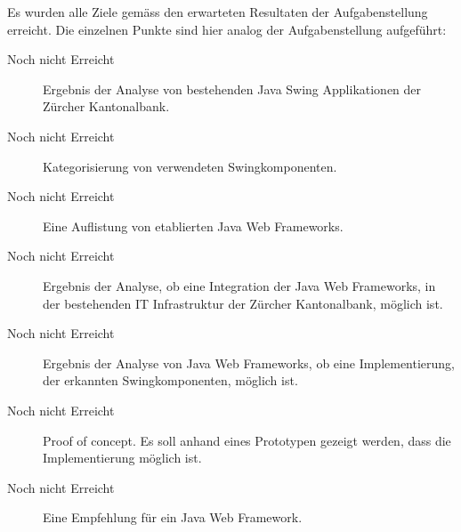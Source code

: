   Es wurden alle Ziele gemäss den erwarteten Resultaten der Aufgabenstellung
  erreicht. Die einzelnen Punkte sind hier analog der Aufgabenstellung
  aufgeführt:
  
  \begin{description}
    \item [Noch nicht Erreicht] Ergebnis der Analyse von bestehenden Java Swing
    Applikationen der Zürcher Kantonalbank.
    \item [Noch nicht Erreicht] Kategorisierung von verwendeten
    Swingkomponenten.
    \item [Noch nicht Erreicht] Eine Auflistung von etablierten Java Web
    Frameworks.
    \item [Noch nicht Erreicht] Ergebnis der Analyse, ob eine Integration der
    Java Web Frameworks, in der bestehenden IT Infrastruktur der Zürcher
    Kantonalbank, möglich ist.
    \item [Noch nicht Erreicht] Ergebnis der Analyse von Java Web Frameworks, ob
    eine Implementierung, der erkannten Swingkomponenten, möglich ist.
    \item [Noch nicht Erreicht] Proof of concept. Es soll anhand eines
    Prototypen gezeigt werden, dass die Implementierung möglich ist.
    \item [Noch nicht Erreicht] Eine Empfehlung für ein Java Web Framework.
  \end{description}